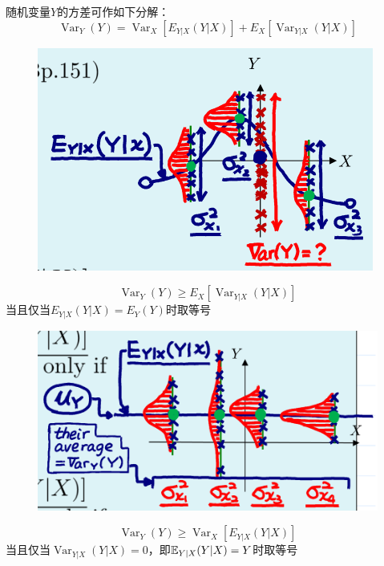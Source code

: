 \begin{theorem}[重方差公式]\label{thm:var_dec}
    随机变量$Y$的方差可作如下分解：
    \[ \operatorname{Var}_Y(Y)=\operatorname{Var}_X[E_{Y|X}(Y|X)] + E_X[\operatorname{Var}_{Y|X}(Y|X)] \]
\end{theorem}

\begin{figure}
    \centering
    \includegraphics{image/var_dec.png}
\end{figure}

\begin{corollary}
    \[ \operatorname{Var}_Y(Y) \ge E_X[\operatorname{Var}_{Y|X}(Y|X)] \]
    当且仅当$E_{Y|X}(Y|X)=E_Y(Y)$时取等号
\end{corollary}

\begin{figure}
    \centering
    \includegraphics{image/var_dec2.png}
\end{figure}

\begin{corollary}
    \[ \operatorname{Var}_Y(Y) \ge \operatorname{Var}_X[E_{Y|X}(Y|X)] \]
    当且仅当$\operatorname{Var}_{Y|X}(Y|X)=0$，即$\mathbb{E}_{Y|X}(Y|X)=Y$时取等号
\end{corollary}

